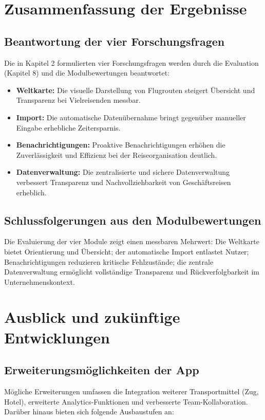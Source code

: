 \section{Zusammenfassung der Ergebnisse}
\subsection{Beantwortung der vier Forschungsfragen}
Die in Kapitel 2 formulierten vier Forschungsfragen werden durch die Evaluation
(Kapitel 8) und die Modulbewertungen beantwortet:

\begin{itemize}
  \item \textbf{Weltkarte:} Die visuelle Darstellung von Flugrouten steigert
  Übersicht und Transparenz bei Vielreisenden messbar.
  \item \textbf{Import:} Die automatische Datenübernahme bringt gegenüber
  manueller Eingabe erhebliche Zeitersparnis.
  \item \textbf{Benachrichtigungen:} Proaktive Benachrichtigungen erhöhen die
  Zuverlässigkeit und Effizienz bei der Reiseorganisation deutlich.
  \item \textbf{Datenverwaltung:} Die zentralisierte und sichere Datenverwaltung
  verbessert Transparenz und Nachvollziehbarkeit von Geschäftsreisen erheblich.
\end{itemize}

\subsection{Schlussfolgerungen aus den Modulbewertungen}
Die Evaluierung der vier Module zeigt einen messbaren Mehrwert: Die Weltkarte
bietet Orientierung und Übersicht; der automatische Import entlastet Nutzer;
Benachrichtigungen reduzieren kritische Fehlzustände; die zentrale Datenverwaltung
ermöglicht vollständige Transparenz und Rückverfolgbarkeit im Unternehmenskontext.

\section{Ausblick und zukünftige Entwicklungen}
\subsection{Erweiterungsmöglichkeiten der App}
Mögliche Erweiterungen umfassen die Integration weiterer Transportmittel (Zug, Hotel), erweiterte Analytics-Funktionen und verbesserte Team-Kollaboration. Darüber hinaus bieten sich folgende Ausbaustufen an:

